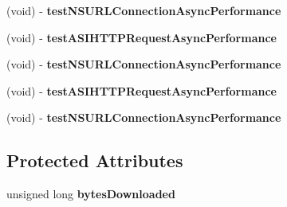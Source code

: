 \begin{DoxyCompactItemize}
\item 
\hypertarget{interface_performance_tests_a233daefbd81744cc7a02c605dbb7a614}{
(void) -\/ {\bfseries test\-N\-S\-U\-R\-L\-Connection\-Async\-Performance}}
\label{interface_performance_tests_a233daefbd81744cc7a02c605dbb7a614}

\item 
\hypertarget{interface_performance_tests_a8422f6bc3942bd60f902ac02874861d5}{
(void) -\/ {\bfseries test\-A\-S\-I\-H\-T\-T\-P\-Request\-Async\-Performance}}
\label{interface_performance_tests_a8422f6bc3942bd60f902ac02874861d5}

\item 
\hypertarget{interface_performance_tests_a233daefbd81744cc7a02c605dbb7a614}{
(void) -\/ {\bfseries test\-N\-S\-U\-R\-L\-Connection\-Async\-Performance}}
\label{interface_performance_tests_a233daefbd81744cc7a02c605dbb7a614}

\item 
\hypertarget{interface_performance_tests_a8422f6bc3942bd60f902ac02874861d5}{
(void) -\/ {\bfseries test\-A\-S\-I\-H\-T\-T\-P\-Request\-Async\-Performance}}
\label{interface_performance_tests_a8422f6bc3942bd60f902ac02874861d5}

\item 
\hypertarget{interface_performance_tests_a233daefbd81744cc7a02c605dbb7a614}{
(void) -\/ {\bfseries test\-N\-S\-U\-R\-L\-Connection\-Async\-Performance}}
\label{interface_performance_tests_a233daefbd81744cc7a02c605dbb7a614}

\end{DoxyCompactItemize}
\subsection*{\-Protected \-Attributes}
\begin{DoxyCompactItemize}
\item 
\hypertarget{interface_performance_tests_ad80d9513a70e66fb764440c62fb86513}{
unsigned long {\bfseries bytes\-Downloaded}}
\label{interface_performance_tests_ad80d9513a70e66fb764440c62fb86513}

\end{DoxyCompactItemize}
